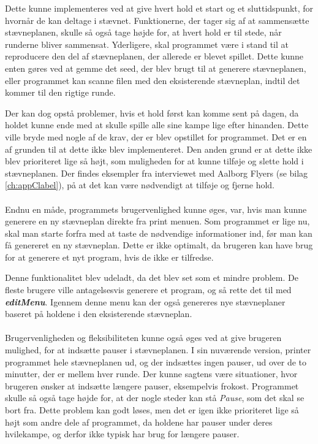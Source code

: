 \par 
Dette kunne implementeres ved at give hvert hold et start og et sluttidspunkt, for hvornår de kan deltage i stævnet. Funktionerne, der tager sig af at sammensætte stævneplanen, skulle så også tage højde for, at hvert hold er til stede, når runderne bliver sammensat. Yderligere, skal programmet være i stand til at reproducere den del af stævneplanen, der allerede er blevet spillet. Dette kunne enten gøres ved at gemme det seed, der blev brugt til at generere stævneplanen, eller programmet kan scanne filen med den eksisterende stævneplan, indtil det kommer til den rigtige runde.
\par
Der kan dog opstå problemer, hvis et hold først kan komme sent på dagen, da holdet kunne ende med at skulle spille alle sine kampe lige efter hinanden. Dette ville bryde med nogle af de krav, der er blev opstillet for programmet. Det er en af grunden til at dette ikke blev implementeret. Den anden grund er at dette ikke blev prioriteret lige så højt, som muligheden for at kunne tilføje og slette hold i stævneplanen. Der findes eksempler fra interviewet med Aalborg Flyers (se bilag \ref{ch:appClabel}), på at det kan være nødvendigt at tilføje og fjerne hold.
\\\\
Endnu en måde, programmets brugervenlighed kunne øges, var, hvis man kunne generere en ny stævneplan direkte fra print menuen. Som programmet er lige nu, skal man starte forfra med at taste de nødvendige informationer ind, før man kan få genereret en ny stævneplan. Dette er ikke optimalt, da brugeren kan have brug for at generere et nyt program, hvis de ikke er tilfredse. 
\par
Denne funktionalitet blev udeladt, da det blev set som et mindre problem. De fleste brugere ville antagelsesvis generere et program, og så rette det til med \textbf{\textit{editMenu}}. Igennem denne menu kan der også genereres nye stævneplaner baseret på holdene i den eksisterende stævneplan.
\\\\
Brugervenligheden og fleksibiliteten kunne også øges ved at give brugeren mulighed, for at indsætte pauser i stævneplanen. I sin nuværende version, printer programmet hele stævneplanen ud, og der indsættes ingen pauser, ud over de to minutter, der er mellem hver runde. Der kunne sagtens være situationer, hvor brugeren ønsker at indsætte længere pauser, eksempelvis frokost. Programmet skulle så også tage højde for, at der nogle steder kan stå \textit{Pause}, som det skal se bort fra. Dette problem kan godt løses, men det er igen ikke prioriteret lige så højt som andre dele af programmet, da holdene har pauser under deres hvilekampe, og derfor ikke typisk har brug for længere pauser. 
